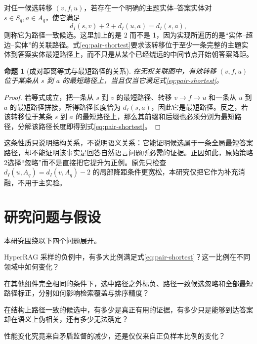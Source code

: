 \documentclass[UTF8,11pt]{ctexart}
\newtheorem{proposition}{命题}
\begin{document}
对任一候选转移 $(v,f,u)$，若存在一个明确的主题实体--答案实体对 $s\in S_q,a\in A_q$，使它满足
\begin{equation}
 d_I(s,v)+2+d_I(u,a)=d_I(s,a), \label{eq:pair-shortest}
\end{equation}
则称它为路径一致候选。这里加上的是 2 而不是 1，因为实现所遍历的是“实体--超边--实体”的关联路径。式\eqref{eq:pair-shortest}要求该转移位于至少一条完整的主题实体到答案实体最短路径上，而不只是从某个已经绕远的中间节点开始朝答案降距。

\begin{proposition}[成对距离等式与最短路径的关系]
在无权关联图中，有效转移 $(v,f,u)$ 位于某条从 $s$ 到 $a$ 的最短路径上，当且仅当它满足式\eqref{eq:pair-shortest}。
\end{proposition}
\begin{proof}
若等式成立，把一条从 $s$ 到 $v$ 的最短路径、转移 $v\!\rightarrow\!f\!\rightarrow\!u$ 和一条从 $u$ 到 $a$ 的最短路径拼接，所得路径长度恰为 $d_I(s,a)$，因此它是最短路径。反之，若该转移位于某条 $s$ 到 $a$ 的最短路径上，那么其前缀和后缀也必须分别为最短路径，分解该路径长度即得到式\eqref{eq:pair-shortest}。
\end{proof}

这条性质只说明结构关系，不说明语义关系：它能证明候选属于一条全局最短答案路径，却不能证明该事实是回答自然语言问题所必需的证据。正因如此，原始策略2选择“忽略”而不是直接把它提升为正例。原先只检查 $d_I(u,A_q)=d_I(v,A_q)-2$ 的局部降距条件更宽松，本研究仅把它作为补充消融，不用于主实验。

\section{研究问题与假设}

本研究围绕以下四个问题展开。

\begin{description}[leftmargin=3.6em,style=nextline]
  \item[问题一：发生率。] HyperRAG 采样的负例中，有多大比例满足式\eqref{eq:pair-shortest}？这一比例在不同领域中如何变化？

  \item[问题二：标签策略。] 在其他组件完全相同的条件下，选中路径之外标负、路径一致候选忽略和全部最短路径标正，分别如何影响检索覆盖与排序精度？

  \item[问题三：语义有效性。] 在结构上路径一致的候选中，有多少是真正有用的证据，有多少只是能够到达答案却在语义上伪相关，还有多少无法确定？

  \item[问题四：作用机制。] 性能变化究竟来自矛盾监督的减少，还是仅仅来自正负样本比例的变化？
\end{description}
\end{document}
